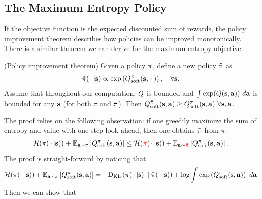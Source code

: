 \subsection{The Maximum Entropy Policy}
\label{app:max_ent_policy}
If the objective function is the expected discounted sum of rewards, the policy improvement theorem \cite{sutton1998reinforcement} describes how policies can be improved monotonically. There is a similar theorem we can derive for the maximum entropy objective:
\begin{theorem}
\label{the:policy_improvement}
(Policy improvement theorem) Given a policy $\pi$, define a new policy $\tilde{\pi}$ as
\begin{equation}
\tilde{\pi}(\,\cdot\, |\mathbf{s}) \propto \exp\left(Q^{\pi}_{\text{soft}}(\mathbf{s},\,\cdot\,)\right), \quad \forall\mathbf{s}.
\end{equation}
Assume that throughout our computation, $Q$ is bounded and $\int \exp(Q(\mathbf{s},\mathbf{a})) \ d\mathbf{a}$ is bounded for any $\mathbf{s}$ (for both $\pi$ and $\tilde{\pi}$). Then $Q^{\tilde{\pi}}_{\text{soft}}(\mathbf{s},\mathbf{a}) \geq Q^{\pi}_{\text{soft}}(\mathbf{s},\mathbf{a})\ \forall \mathbf{s},\mathbf{a}$. 
\end{theorem}
The proof relies on the following observation: if one greedily maximize the sum of entropy and value with one-step look-ahead, then one obtains $\tilde{\pi}$ from $\pi$:
\begin{equation}
\begin{split}
\entropy(\pi(\sdots | \state)) + \EE{\action \sim \policy}{\Qpisoft(\state,\action)} \leq \entropy(\pitildered(\sdots | \state)) + \E{\action \sim \pitildered}{\Qpisoft(\state,\action)}.
\end{split}
\end{equation}
The proof is straight-forward by noticing that 
\begin{equation}
\begin{split}
\mathcal{H}(\pi(\,\cdot\, | \mathbf{s})) + \operatorname{\mathbb{E}}_{\mathbf{a} \sim \pi}\left[Q^{\pi}_{\text{soft}}(\mathbf{s},\mathbf{a})\right] = - \mathrm{D_{KL}}\left(\pi(\,\cdot\,|\mathbf{s})\;\middle\|\;\tilde{\pi}(\,\cdot\,|\mathbf{s})\right) + \log\int \exp\left(Q^{\pi}_{\text{soft}}(\mathbf{s},\mathbf{a})\right) \ d\mathbf{a}
\end{split}
\end{equation}
Then we can show that
